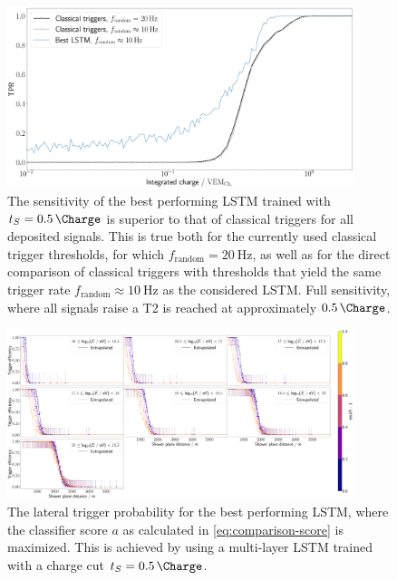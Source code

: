 \begin{figure}
	\centering
	\includegraphics[width=0.9\textwidth]{./plots/LSTM_charge_TPR.png}
	\caption{The sensitivity of the best performing LSTM trained with $t_S = \SI{0.5}{\Charge}$ is superior to that of classical triggers for all deposited 
	signals. This is true both for the currently used classical trigger thresholds, for which $f_\text{random} = \SI{20}{\hertz}$, as well as for the direct 
	comparison of classical triggers with thresholds that yield the same trigger rate $f_\text{random} \approx \SI{10}{\hertz}$ as the considered LSTM. Full 
	sensitivity, where all signals raise a T2 is reached at approximately $\SI{0.5}{\Charge}$.}
	\label{fig:LSTM-charge-TPR}
\end{figure}

\begin{figure}
	\centering
	\includegraphics[width=0.9\textwidth]{./plots/LSTM_LTP.png}
	\caption{The lateral trigger probability for the best performing LSTM, where the classifier score $a$ as calculated in \autoref{eq:comparison-score} is 
	maximized. This is achieved by using a multi-layer LSTM trained with a charge cut $t_S = \SI{0.5}{\Charge}$.}
	\label{fig:LSTM-LTP}
\end{figure}

